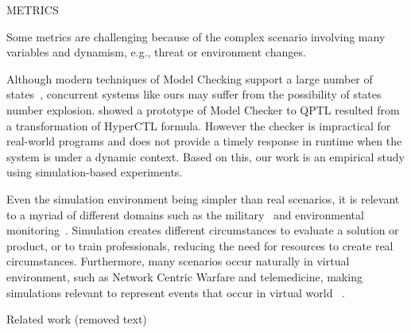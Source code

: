 
METRICS

Some metrics are challenging because of the complex scenario involving many variables and dynamism, e.g., threat or environment changes.



Although modern techniques of Model Checking support a large number of states~\citep{MC01}, concurrent systems like ours may suffer from the possibility of states number explosion. \cite{clarkson2014} showed a prototype of Model Checker to QPTL resulted from a transformation of HyperCTL formula. However the checker is impractical for real-world programs and does not provide a timely response in runtime when the system is under a dynamic context. Based on this, our work is an empirical study using simulation-based experiments. 

Even the simulation environment being simpler than real scenarios, it is relevant to a myriad of different domains such as the military~\citep{CC03} and environmental monitoring~\cite{simulation001}. Simulation creates different circumstances to evaluate a solution or product, or to train professionals, reducing the need for resources to create real circumstances. Furthermore, many scenarios occur naturally in virtual environment, such as Network Centric Warfare and telemedicine, making simulations relevant to represent events that occur in virtual world
~\citep{telemedicine01, FRANCE2014, CC01}.



Related work (removed text)




